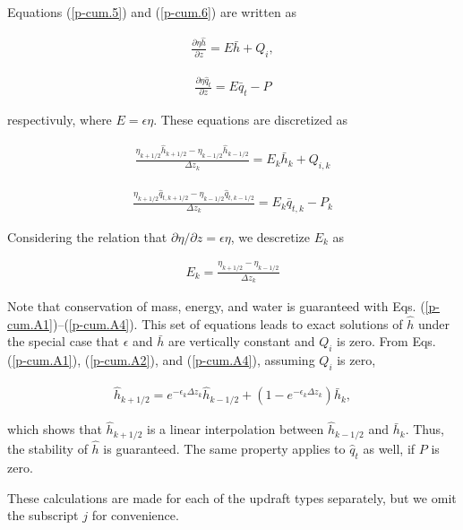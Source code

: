 Equations (\ref{p-cum.5}) and (\ref{p-cum.6}) are written as

\begin{eqnarray}
 \frac{\partial \eta \hat{h}}{\partial z} = E \bar{h} + Q_i,
\end{eqnarray}

\begin{eqnarray}
 \frac{\partial \eta \hat{q}_t}{\partial z} = E \bar{q}_t -P
\end{eqnarray}

respectivuly, where \(E = \epsilon\eta\). These equations are discretized as

\begin{eqnarray}
 \frac{\eta_{k+1/2} \hat{h}_{k+1/2} - \eta_{k-1/2} \hat{h}_{k-1/2}}{\Delta z_k} = E_k \bar{h}_k + {Q_{i,k}}  \label{p-cum.A2}
\end{eqnarray}

\begin{eqnarray}
 \frac{\eta_{k+1/2} \hat{q}_{t,k+1/2} - \eta_{k-1/2} \hat{q}_{t,k-1/2}}{\Delta z_k} = E_k {\bar{q}_{t,k}} - P_k  \label{p-cum.A3}
\end{eqnarray}

Considering the relation that \(\partial \eta/\partial z = \epsilon\eta\), we descretize \(E_k\) as

\begin{eqnarray}
 E_k = \frac{\eta_{k+1/2} - \eta_{k-1/2}}{\Delta z_k}  \label{p-cum.A4}
\end{eqnarray}

Note that conservation of mass, energy, and water is guaranteed with Eqs. (\ref{p-cum.A1})--(\ref{p-cum.A4}). This set of equations leads to exact solutions of \(\hat{h}\) under the special
case that \(\epsilon\) and \(\bar{h}\) are vertically constant and \(Q_i\) is zero. From Eqs. (\ref{p-cum.A1}), (\ref{p-cum.A2}), and (\ref{p-cum.A4}), assuming \(Q_i\) is zero,

\begin{eqnarray}
 \hat{h}_{k+1/2} = e^{-\epsilon_k \Delta z_k} \hat{h}_{k - 1/2} + (1 - e^{-\epsilon_k \Delta z_k}) \bar{h}_k,
\end{eqnarray}

which shows that \(\hat{h}_{k+1/2}\) is a linear interpolation between \(\hat{h}_{k - 1/2}\) and \(\bar{h}_k\). Thus, the stability of \(\hat{h}\) is guaranteed. The same property applies to
\(\hat{q}_t\) as well, if \(P\) is zero.

These calculations are made for each of the updraft types separately, but we omit the subscript \(j\) for convenience.

